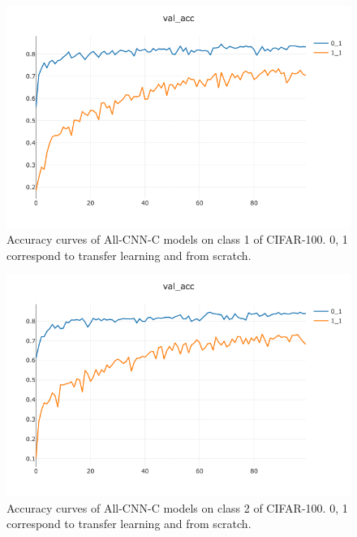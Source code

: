 \documentclass[10pt,twocolumn,letterpaper]{article}
\begin{document}
        \begin{figure}
            \centering            
            \includegraphics[width=\linewidth]{seolen_fig/Transfer_class1_VA.png}
            \caption{Accuracy curves of  All-CNN-C models on class 1 of CIFAR-100. 0, 1 correspond to transfer learning and from scratch.}
            \label{fig:c}
        \end{figure}

        \begin{figure}
            \centering            
            \includegraphics[width=\linewidth]{seolen_fig/Transfer_class2_VA.png}
            \caption{Accuracy curves of  All-CNN-C models on class 2 of CIFAR-100. 0, 1 correspond to transfer learning and from scratch.}
            \label{fig:d}
        \end{figure}
\end{document}
